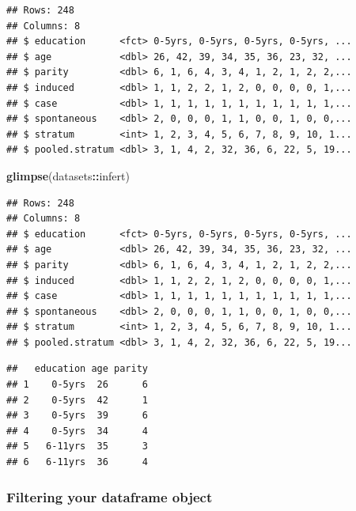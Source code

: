 \documentclass[
]{book}
\newenvironment{Shaded}{\begin{snugshade}}{\end{snugshade}}
\newcommand{\KeywordTok}[1]{\textcolor[rgb]{0.13,0.29,0.53}{\textbf{#1}}}
\newcommand{\NormalTok}[1]{#1}
\newcommand{\OperatorTok}[1]{\textcolor[rgb]{0.81,0.36,0.00}{\textbf{#1}}}
\newcommand{\StringTok}[1]{\textcolor[rgb]{0.31,0.60,0.02}{#1}}
\begin{document}
\begin{verbatim}
## Rows: 248
## Columns: 8
## $ education      <fct> 0-5yrs, 0-5yrs, 0-5yrs, 0-5yrs, ...
## $ age            <dbl> 26, 42, 39, 34, 35, 36, 23, 32, ...
## $ parity         <dbl> 6, 1, 6, 4, 3, 4, 1, 2, 1, 2, 2,...
## $ induced        <dbl> 1, 1, 2, 2, 1, 2, 0, 0, 0, 0, 1,...
## $ case           <dbl> 1, 1, 1, 1, 1, 1, 1, 1, 1, 1, 1,...
## $ spontaneous    <dbl> 2, 0, 0, 0, 1, 1, 0, 0, 1, 0, 0,...
## $ stratum        <int> 1, 2, 3, 4, 5, 6, 7, 8, 9, 10, 1...
## $ pooled.stratum <dbl> 3, 1, 4, 2, 32, 36, 6, 22, 5, 19...
\end{verbatim}

\begin{Shaded}
\begin{Highlighting}[]
\KeywordTok{glimpse}\NormalTok{(datasets}\OperatorTok{::}\NormalTok{infert)}
\end{Highlighting}
\end{Shaded}

\begin{verbatim}
## Rows: 248
## Columns: 8
## $ education      <fct> 0-5yrs, 0-5yrs, 0-5yrs, 0-5yrs, ...
## $ age            <dbl> 26, 42, 39, 34, 35, 36, 23, 32, ...
## $ parity         <dbl> 6, 1, 6, 4, 3, 4, 1, 2, 1, 2, 2,...
## $ induced        <dbl> 1, 1, 2, 2, 1, 2, 0, 0, 0, 0, 1,...
## $ case           <dbl> 1, 1, 1, 1, 1, 1, 1, 1, 1, 1, 1,...
## $ spontaneous    <dbl> 2, 0, 0, 0, 1, 1, 0, 0, 1, 0, 0,...
## $ stratum        <int> 1, 2, 3, 4, 5, 6, 7, 8, 9, 10, 1...
## $ pooled.stratum <dbl> 3, 1, 4, 2, 32, 36, 6, 22, 5, 19...
\end{verbatim}

\begin{Shaded}
\end{Shaded}

\begin{verbatim}
##   education age parity
## 1    0-5yrs  26      6
## 2    0-5yrs  42      1
## 3    0-5yrs  39      6
## 4    0-5yrs  34      4
## 5   6-11yrs  35      3
## 6   6-11yrs  36      4
\end{verbatim}

\hypertarget{filtering-your-dataframe-object}{%
\subsubsection{Filtering your dataframe object}\label{filtering-your-dataframe-object}}
\end{document}
